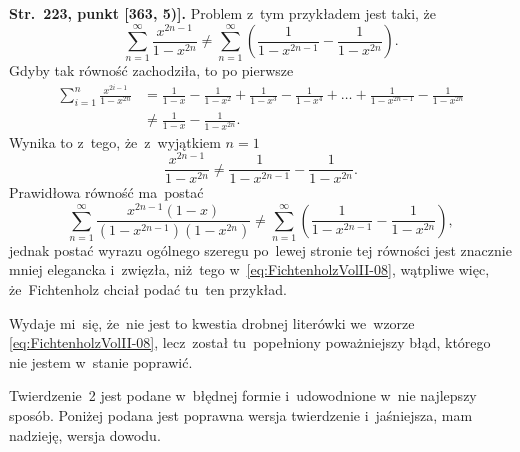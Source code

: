 \documentclass[a4paper,11pt]{article}
\begin{document}
\start \textbf{Str.~223, punkt [363, 5)].} Problem z~tym przykładem
jest taki, że
\begin{equation}
  \label{eq:FichtenholzVolII-08}
  \sum_{ n = 1 }^{ \infty } \frac{ x^{ 2n - 1 } }{ 1 - x^{ 2n } }
  \neq \sum_{ n = 1 }^{ \infty } \left( \frac{ 1 }{ 1 - x^{ 2n - 1 } }
    - \frac{ 1 }{ 1 - x^{ 2n } } \right).
\end{equation}
Gdyby tak równość zachodziła, to po pierwsze
\begin{equation}
  \label{eq:FichtenholzVolII-09}
  \begin{split}
    \sum_{ i = 1 }^{ n } \frac{ x^{ 2i - 1 } }{ 1 - x^{ 2n } }
    &=
      \frac{ 1 }{ 1 - x } - \frac{ 1 }{ 1 - x^{ 2 } }
      + \frac{ 1 }{ 1 - x^{ 3 } } - \frac{ 1 }{ 1 - x^{ 4 } }
      + \ldots + \frac{ 1 }{ 1 - x^{ 2n - 1 } } - \frac{ 1 }{ 1 - x^{ 2n } } \\
    &\neq \frac{ 1 }{ 1 - x } - \frac{ 1 }{ 1 - x^{ 2n } }.
  \end{split}
\end{equation}
Wynika to z~tego, że~z~wyjątkiem $n = 1$
\begin{equation}
  \label{eq:FichtenholzVolII-10}
  \frac{ x^{ 2n - 1 } }{ 1 - x^{ 2n } }
  \neq \frac{ 1 }{ 1 - x^{ 2n - 1 } } - \frac{ 1 }{ 1 - x^{ 2n } }.
\end{equation}
Prawidłowa równość ma~postać
\begin{equation}
  \label{eq:FichtenholzVolII-11}
  \sum_{ n = 1 }^{ \infty } \frac{ x^{ 2n - 1 } ( 1 - x ) }{ ( 1 - x^{ 2n - 1 } )
    ( 1 - x^{ 2n } ) }
  \neq \sum_{ n = 1 }^{ \infty } \left( \frac{ 1 }{ 1 - x^{ 2n - 1 } }
    - \frac{ 1 }{ 1 - x^{ 2n } } \right),
\end{equation}
jednak postać wyrazu ogólnego szeregu po~lewej stronie tej równości
jest znacznie mniej elegancka i~zwięzła, niż~tego
w~\eqref{eq:FichtenholzVolII-08}, wątpliwe więc, że~Fichtenholz chciał
podać tu~ten przykład.

Wydaje mi~się, że~nie jest to kwestia drobnej literówki we~wzorze
\eqref{eq:FichtenholzVolII-08}, lecz~został tu~popełniony poważniejszy
błąd, którego nie jestem w~stanie poprawić.

\vspace{\spaceFour}



\start {} Twierdzenie~2 jest podane w~błędnej formie
i~udowodnione w~nie najlepszy sposób. Poniżej podana jest poprawna
wersja twierdzenie i~jaśniejsza, mam nadzieję, wersja dowodu.
\end{document}
